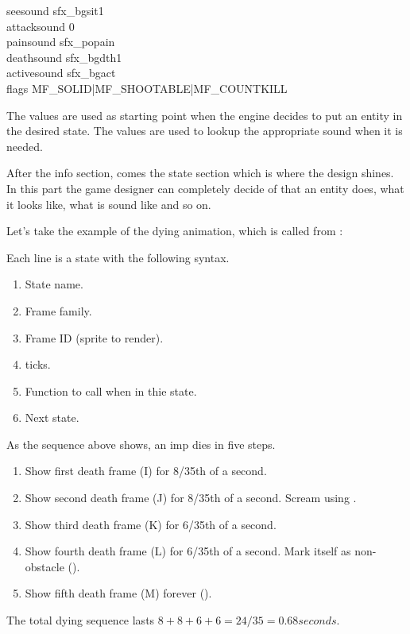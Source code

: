 seesound        sfx\_bgsit1\\
attacksound        0\\
painsound        sfx\_popain\\
deathsound        sfx\_bgdth1\\
activesound        sfx\_bgact\\

flags            MF\_SOLID|MF\_SHOOTABLE|MF\_COUNTKILL\\
\par
The  values are used as starting point when the engine decides to put an entity in the desired state. The  values are used to lookup the appropriate sound when it is needed.\\
\par
After the info section, comes the state section which is where the design shines. In this part the game designer can completely decide of that an entity does, what it looks like, what is sound like and so on.\\
\par
Let's take the example of the dying animation, which is called from :\\
\par
{}
\par

\par
Each line is a state with the following syntax. 
\begin{enumerate}
\item State name.
\item Frame family.
\item Frame ID (sprite to render).
\item ticks.
\item Function to call when in thie state.
\item Next state.
\end{enumerate}
\par
As the sequence above shows, an imp dies in five steps.

\begin{enumerate}
\item Show first death frame (I) for 8/35th of a second.
\item Show second death frame (J) for 8/35th of a second. Scream using .
\item Show third death frame (K) for 6/35th of a second.
\item Show fourth death frame (L) for 6/35th of a second. Mark itself as non-obstacle ().
\item Show fifth death frame (M) forever ().
\end{enumerate}
\par
The total dying sequence lasts $8+8+6+6=24/35 = 0.68 seconds$.
\par



